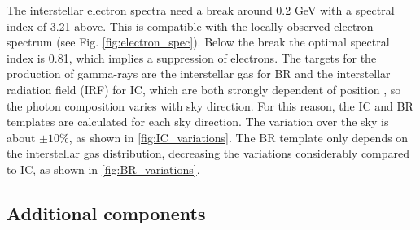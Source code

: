The interstellar electron spectra need a break around 0.2 GeV with a spectral index of 3.21 above. This is compatible with the locally observed electron spectrum (see Fig. \ref{fig:electron_spec}). Below the break the optimal spectral index is 0.81, which implies a suppression of electrons. %
The targets for the production of gamma-rays are the interstellar gas for BR and the interstellar radiation field (IRF) for IC, which are both strongly dependent of position%
, so the photon composition varies with sky direction.
For this reason, the IC and BR templates are calculated for each sky direction. The variation over the sky is about $\pm 10\%$, as shown in \ref{fig:IC_variations}. 
The BR template only depends on the interstellar gas distribution, decreasing the variations considerably compared to IC, as shown in \ref{fig:BR_variations}.







\subsection{Additional components}

